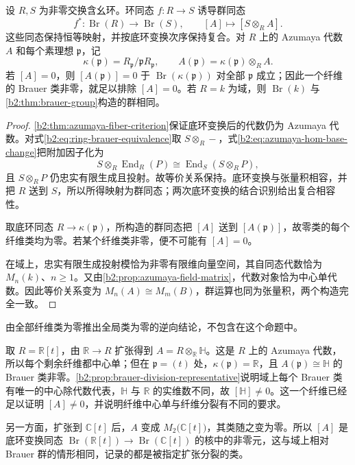 \begin{proposition}\label{b2:prop:ring-brauer-base-change}
	设 \(R,S\) 为非零交换含幺环。环同态 \(f:R\rightarrow S\) 诱导群同态
	\[
		f^*:\operatorname{Br}(R)\longrightarrow\operatorname{Br}(S), \qquad [A]\longmapsto[S\otimes_RA].
	\]
	这些同态保持恒等映射，并按底环变换次序保持复合。对 \(R\) 上的 Azumaya 代数 \(A\) 和每个素理想 \(\mathfrak p\)，记
	\[
		\kappa(\mathfrak p)=R_{\mathfrak p}/\mathfrak pR_{\mathfrak p}, \qquad A(\mathfrak p)=\kappa(\mathfrak p)\otimes_RA.
	\]
	若 \([A]=0\)，则 \([A(\mathfrak p)]=0\) 于 \(\operatorname{Br}(\kappa(\mathfrak p))\) 对全部 \(\mathfrak p\) 成立；因此一个纤维的 Brauer 类非零，就足以排除 \([A]=0\)。若 \(R=k\) 为域，则 \(\operatorname{Br}(k)\) 与\cref{b2:thm:brauer-group}构造的群相同。
\end{proposition}
\begin{proof}
	\cref{b2:thm:azumaya-fiber-criterion}保证底环变换后的代数仍为 Azumaya 代数。对式\eqref{b2:eq:ring-brauer-equivalence}取 \(S\otimes_R-\)，式\eqref{b2:eq:azumaya-hom-base-change}把附加因子化为
	\[
		S\otimes_R\operatorname{End}_R(P) \cong\operatorname{End}_S(S\otimes_RP),
	\]
	且 \(S\otimes_RP\) 仍忠实有限生成且投射。故等价关系保持。底环变换与张量积相容，并把 \(R\) 送到 \(S\)，所以所得映射为群同态；两次底环变换的结合识别给出复合相容性。

	取底环同态 \(R\rightarrow\kappa(\mathfrak p)\)，所构造的群同态把 \([A]\) 送到 \([A(\mathfrak p)]\)，故零类的每个纤维类均为零。若某个纤维类非零，便不可能有 \([A]=0\)。

	在域上，忠实有限生成投射模恰为非零有限维向量空间，其自同态代数恰为 \(M_n(k)\)、\(n\ge1\)。又由\cref{b2:prop:azumaya-field-matrix}，代数对象恰为中心单代数。因此等价关系变为 \(M_n(A)\cong M_m(B)\)，群运算也同为张量积，两个构造完全一致。
\end{proof}

由全部纤维类为零推出全局类为零的逆向结论，不包含在这个命题中。

\ProseParagraphBreak
取 \(R=\mathbb R[t]\)，由 \(\mathbb R\rightarrow R\) 扩张得到 \(A=R\otimes_{\mathbb R}\mathbb H\)。这是 \(R\) 上的 Azumaya 代数，所以每个剩余纤维都中心单；但在 \(\mathfrak p=(t)\) 处，\(\kappa(\mathfrak p)=\mathbb R\)，且 \(A(\mathfrak p)\cong\mathbb H\) 的 Brauer 类非零。\cref{b2:prop:brauer-division-representative}说明域上每个 Brauer 类有唯一的中心除代数代表，\(\mathbb H\) 与 \(\mathbb R\) 的实维数不同，故 \([\mathbb H]\ne0\)。这一个纤维已经足以证明 \([A]\ne0\)，并说明纤维中心单与纤维分裂有不同的要求。

\ProseParagraphBreak
另一方面，扩张到 \(\mathbb C[t]\) 后，\(A\) 变成 \(M_2\bigl(\mathbb C[t]\bigr)\)，其类随之变为零。所以 \([A]\) 是底环变换同态 \(\operatorname{Br}(\mathbb R[t])\rightarrow\operatorname{Br}(\mathbb C[t])\) 的核中的非零元，这与域上相对 Brauer 群的情形相同，记录的都是被指定扩张分裂的类。

